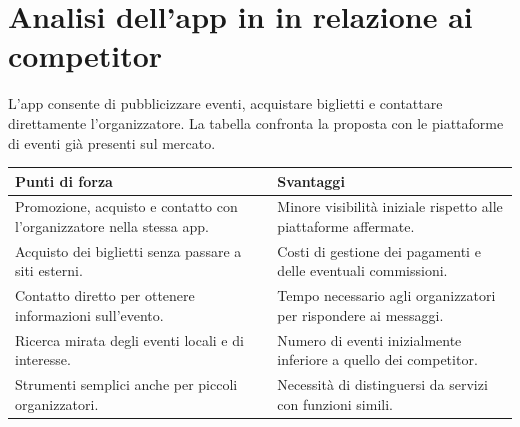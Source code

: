 \documentclass[a4paper,11pt]{article}
\begin{document}
\section*{Analisi dell'app in in relazione ai competitor}

L'app consente di pubblicizzare eventi, acquistare biglietti e contattare
direttamente l'organizzatore. La tabella confronta la proposta con le
piattaforme di eventi gi\`a presenti sul mercato.

\begin{table}[htbp]
\centering
\renewcommand{\arraystretch}{1.4}
\begin{tabular}{|p{6.5cm}|p{6.5cm}|}
\hline
\textbf{Punti di forza} & \textbf{Svantaggi} \\
\hline
Promozione, acquisto e contatto con l'organizzatore nella stessa app. &
Minore visibilit\`a iniziale rispetto alle piattaforme affermate. \\
\hline
Acquisto dei biglietti senza passare a siti esterni. &
Costi di gestione dei pagamenti e delle eventuali commissioni. \\
\hline
Contatto diretto per ottenere informazioni sull'evento. &
Tempo necessario agli organizzatori per rispondere ai messaggi. \\
\hline
Ricerca mirata degli eventi locali e di interesse. &
Numero di eventi inizialmente inferiore a quello dei competitor. \\
\hline
Strumenti semplici anche per piccoli organizzatori. &
Necessit\`a di distinguersi da servizi con funzioni simili. \\
\hline
\end{tabular}
\end{table}
\end{document}
